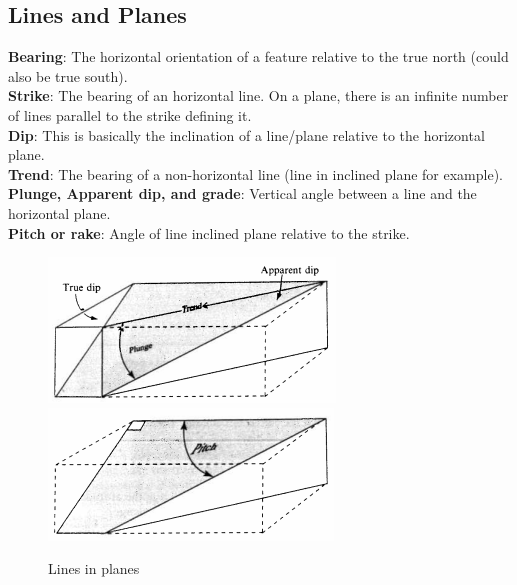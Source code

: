 \documentclass[12pt,a4paper]{report}
\begin{document}
\subsection*{Lines and Planes}
\textbf{Bearing}: The horizontal orientation of a feature relative to the true north (could also be true south).\\
\textbf{Strike}: The bearing of an horizontal line. On a plane, there is an infinite number of lines parallel to the strike defining it.\\
\textbf{Dip}: This is basically the inclination of a line/plane relative to the horizontal plane.\\
\textbf{Trend}: The bearing of a non-horizontal line (line in inclined plane for example).\\
\textbf{Plunge, Apparent dip, and grade}: Vertical angle between a line and the horizontal plane.\\
\textbf{Pitch or rake}: Angle of line inclined plane relative to the strike.\\
\begin{figure}[h]
  \includegraphics[scale=0.80]{true-dip-and-apparent-dip.png}
  \includegraphics[scale=0.80]{pitch-of-a-line.png}
  \centering
  \caption{Lines in planes}
\end{figure}
\end{document}
